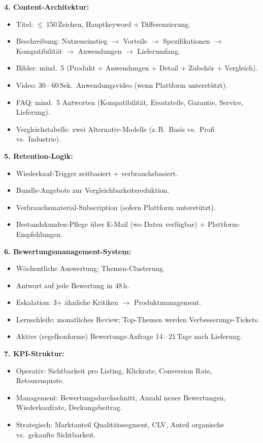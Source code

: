 \documentclass[11pt,a4paper,oneside]{article}
\begin{document}
\begin{loesungbox}
\textbf{4. Content-Architektur:}
\begin{itemize}
  \item Titel: $\leq$\,150\,Zeichen, Hauptkeyword + Differenzierung.
  \item Beschreibung: Nutzeneinstieg $\rightarrow$ Vorteile $\rightarrow$ Spezifikationen $\rightarrow$ Kompatibilität $\rightarrow$ Anwendungen $\rightarrow$ Lieferumfang.
  \item Bilder: mind.\ 5 (Produkt + Anwendungen + Detail + Zubehör + Vergleich).
  \item Video: 30\,--\,60\,Sek.\ Anwendungsvideo (wenn Plattform unterstützt).
  \item FAQ: mind.\ 5 Antworten (Kompatibilität, Ersatzteile, Garantie, Service, Lieferung).
  \item Vergleichstabelle: zwei Alternativ-Modelle (z.\,B.\ Basis vs.\ Profi vs.\ Industrie).
\end{itemize}

\textbf{5. Retention-Logik:}
\begin{itemize}
  \item Wiederkauf-Trigger zeitbasiert + verbrauchsbasiert.
  \item Bundle-Angebote zur Vergleichbarkeitsreduktion.
  \item Verbrauchsmaterial-Subscription (sofern Plattform unterstützt).
  \item Bestandskunden-Pflege über E-Mail (wo Daten verfügbar) + Plattform-Empfehlungen.
\end{itemize}

\textbf{6. Bewertungsmanagement-System:}
\begin{itemize}
  \item Wöchentliche Auswertung; Themen-Clusterung.
  \item Antwort auf jede Bewertung in 48\,h.
  \item Eskalation: 3+ ähnliche Kritiken $\rightarrow$ Produktmanagement.
  \item Lernschleife: monatliches Review; Top-Themen werden Verbesserungs-Tickets.
  \item Aktive (regelkonforme) Bewertungs-Anfrage 14\,--\,21\,Tage nach Lieferung.
\end{itemize}

\textbf{7. KPI-Struktur:}
\begin{itemize}
  \item Operativ: Sichtbarkeit pro Listing, Klickrate, Conversion Rate, Retourenquote.
  \item Management: Bewertungsdurchschnitt, Anzahl neuer Bewertungen, Wiederkaufrate, Deckungsbeitrag.
  \item Strategisch: Marktanteil Qualitätssegment, CLV, Anteil organische vs.\ gekaufte Sichtbarkeit.
\end{itemize}


\end{loesungbox}
\end{document}
